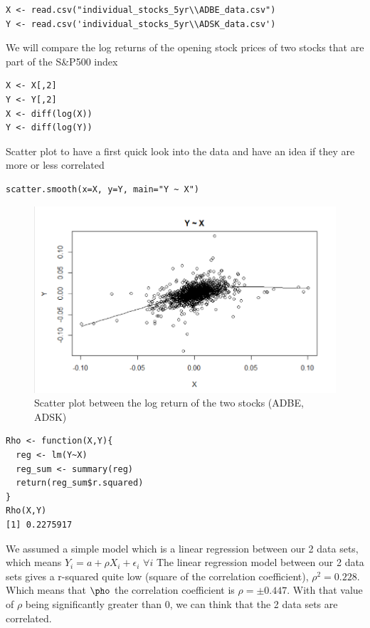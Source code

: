 \documentclass[11pt]{article}
\begin{document}
\begin{lstlisting}
X <- read.csv("individual_stocks_5yr\\ADBE_data.csv")
Y <- read.csv('individual_stocks_5yr\\ADSK_data.csv')
\end{lstlisting}
We will compare the log returns of the opening stock prices of two stocks that are part of the S&P500 index
\begin{lstlisting}
X <- X[,2]
Y <- Y[,2]
X <- diff(log(X))
Y <- diff(log(Y))
\end{lstlisting}
Scatter plot to have a first quick look into the data and have an idea if they are more or less correlated 
\begin{lstlisting}
scatter.smooth(x=X, y=Y, main="Y ~ X")
\end{lstlisting}
\begin{figure}[!ht]
 \center
  \includegraphics[width=\linewidth]{img/scatter_plot.PNG}
  \caption{Scatter plot between the log return of the two stocks (ADBE, ADSK)}
  \label{fig:plot data}
\end{figure}
\begin{lstlisting}
Rho <- function(X,Y){
  reg <- lm(Y~X)
  reg_sum <- summary(reg)
  return(reg_sum$r.squared)
}
Rho(X,Y)
[1] 0.2275917
\end{lstlisting}
We assumed a simple model which is a linear regression between our 2 data sets, which means $Y_{i} = a + \rho X_{i} + \epsilon_{i}$  $\forall i$
The linear regression model between our 2 data sets gives a r-squared quite low (square of the correlation coefficient), $\rho ^{2} = 0.228$. Which means that $\pho$ the correlation coefficient is $\rho = \pm0.447$. 
With that value of $\rho$ being significantly greater than $0$, we can think that the 2 data sets are correlated.  
\end{document}
